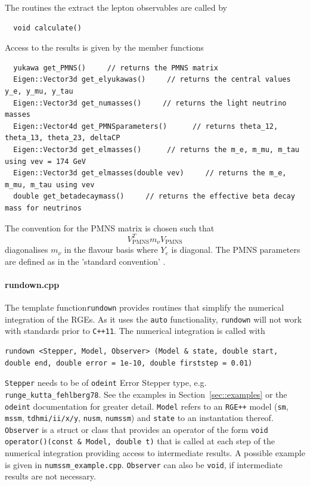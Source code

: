 \documentclass[11pt,a4paper]{article}
\begin{document}
The routines the extract the lepton observables are called by
\begin{lstlisting}
  void calculate()
\end{lstlisting}
Access to the results is given by the member functions
\begin{lstlisting}
  yukawa get_PMNS()     // returns the PMNS matrix
  Eigen::Vector3d get_elyukawas()     // returns the central values y_e, y_mu, y_tau
  Eigen::Vector3d get_numasses()     // returns the light neutrino masses
  Eigen::Vector4d get_PMNSparameters()      // returns theta_12, theta_13, theta_23, deltaCP
  Eigen::Vector3d get_elmasses()      // returns the m_e, m_mu, m_tau using vev = 174 GeV
  Eigen::Vector3d get_elmasses(double vev)     // returns the m_e, m_mu, m_tau using vev
  double get_betadecaymass()     // returns the effective beta decay mass for neutrinos
\end{lstlisting}
The convention for the PMNS matrix is chosen such that
\begin{equation}
  V_{\mathrm{PMNS}}^T m_\nu V_{\mathrm{PMNS}}
\end{equation}
diagonalises $m_\nu$ in the flavour basis where $Y_e$ is diagonal. The PMNS parameters are defined as in the 'standard convention' \cite{Patrignani:2016xqp}.

\paragraph{rundown.cpp}
The template function\texttt{rundown} provides routines that simplify the numerical integration of the RGEs. As it uses the \texttt{auto} functionality, \texttt{rundown} will not work with standards prior to \texttt{C++11}. The numerical integration is called with
\begin{lstlisting}
rundown <Stepper, Model, Observer> (Model & state, double start, double end, double error = 1e-10, double firststep = 0.01)
\end{lstlisting}
\texttt{Stepper} needs to be of \texttt{odeint} Error Stepper type, e.g. \texttt{runge\_kutta\_fehlberg78}. See the examples in Section~\ref{sec::examples} or the \texttt{odeint} documentation for greater detail. \texttt{Model} refers to an \texttt{RGE++} model (\texttt{sm}, \texttt{mssm}, \texttt{tdhmi/ii/x/y}, \texttt{nusm}, \texttt{numssm}) and \texttt{state} to an instantation thereof. \texttt{Observer} is a struct or class that provides an operator of the form \texttt{void operator()(const \& Model, double t)} that is called at each step of the numerical integration providing access to intermediate results. A possible example is given in \texttt{numssm\_example.cpp}. \texttt{Observer} can also be \texttt{void}, if intermediate results are not necessary.
\end{document}
